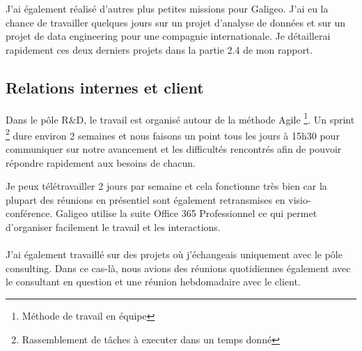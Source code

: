 J’ai également réalisé d’autres plus petites missions pour Galigeo. J’ai eu la chance de travailler quelques jours sur un projet d’analyse de données et sur un projet de data engineering pour une compagnie internationale. Je détaillerai rapidement ces deux derniers projets dans la partie 2.4 de mon rapport.


\subsection{Relations internes et client}

Dans le pôle R\&D, le travail est organisé autour de la méthode Agile \footnote{Méthode de travail en équipe}. Un sprint \footnote{Rassemblement de tâches à executer dans un temps donné} dure environ 2 semaines et nous faisons un point tous les jours à 15h30 pour communiquer sur notre avancement et les difficultés rencontrés afin de pouvoir répondre rapidement aux besoins de chacun.

Je peux télétravailler 2 jours par semaine et cela fonctionne très bien car la plupart des réunions en présentiel sont également retransmises en visio-conférence. Galigeo utilise la suite Office 365 Professionnel ce qui permet d’organiser facilement le travail et les interactions.

\paragraph*{}

J’ai également travaillé sur des projets où j’échangeais uniquement avec le pôle consulting. Dans ce cas-là, nous avions des réunions quotidiennes également avec le consultant en question et une réunion hebdomadaire avec le client.

